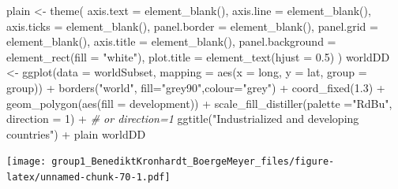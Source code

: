 \documentclass[
  11pt,
  a4paper,
  twoside]{scrbook}
\newenvironment{Shaded}{\begin{snugshade}}{\end{snugshade}}
\newcommand{\AttributeTok}[1]{\textcolor[rgb]{0.77,0.63,0.00}{#1}}
\newcommand{\CommentTok}[1]{\textcolor[rgb]{0.56,0.35,0.01}{\textit{#1}}}
\newcommand{\DecValTok}[1]{\textcolor[rgb]{0.00,0.00,0.81}{#1}}
\newcommand{\FloatTok}[1]{\textcolor[rgb]{0.00,0.00,0.81}{#1}}
\newcommand{\FunctionTok}[1]{\textcolor[rgb]{0.00,0.00,0.00}{#1}}
\newcommand{\NormalTok}[1]{#1}
\newcommand{\OtherTok}[1]{\textcolor[rgb]{0.56,0.35,0.01}{#1}}
\newcommand{\SpecialCharTok}[1]{\textcolor[rgb]{0.00,0.00,0.00}{#1}}
\newcommand{\StringTok}[1]{\textcolor[rgb]{0.31,0.60,0.02}{#1}}
\begin{document}
\linespread{1}

\begin{Shaded}
\begin{Highlighting}[]

\NormalTok{plain }\OtherTok{\textless{}{-}} \FunctionTok{theme}\NormalTok{(}
  \AttributeTok{axis.text =} \FunctionTok{element\_blank}\NormalTok{(),}
  \AttributeTok{axis.line =} \FunctionTok{element\_blank}\NormalTok{(),}
  \AttributeTok{axis.ticks =} \FunctionTok{element\_blank}\NormalTok{(),}
  \AttributeTok{panel.border =} \FunctionTok{element\_blank}\NormalTok{(),}
  \AttributeTok{panel.grid =} \FunctionTok{element\_blank}\NormalTok{(),}
  \AttributeTok{axis.title =} \FunctionTok{element\_blank}\NormalTok{(),}
  \AttributeTok{panel.background =} \FunctionTok{element\_rect}\NormalTok{(}\AttributeTok{fill =} \StringTok{"white"}\NormalTok{),}
  \AttributeTok{plot.title =} \FunctionTok{element\_text}\NormalTok{(}\AttributeTok{hjust =} \FloatTok{0.5}\NormalTok{)}
\NormalTok{)}
\NormalTok{worldDD }\OtherTok{\textless{}{-}} \FunctionTok{ggplot}\NormalTok{(}\AttributeTok{data =}\NormalTok{ worldSubset, }\AttributeTok{mapping =} \FunctionTok{aes}\NormalTok{(}\AttributeTok{x =}\NormalTok{ long, }\AttributeTok{y =}\NormalTok{ lat, }\AttributeTok{group =}\NormalTok{ group)) }\SpecialCharTok{+}
  \FunctionTok{borders}\NormalTok{(}\StringTok{"world"}\NormalTok{, }\AttributeTok{fill=}\StringTok{"grey90"}\NormalTok{,}\AttributeTok{colour=}\StringTok{"grey"}\NormalTok{) }\SpecialCharTok{+} 
  \FunctionTok{coord\_fixed}\NormalTok{(}\FloatTok{1.3}\NormalTok{) }\SpecialCharTok{+}
  \FunctionTok{geom\_polygon}\NormalTok{(}\FunctionTok{aes}\NormalTok{(}\AttributeTok{fill =}\NormalTok{ development)) }\SpecialCharTok{+}
  \FunctionTok{scale\_fill\_distiller}\NormalTok{(}\AttributeTok{palette =}\StringTok{"RdBu"}\NormalTok{, }\AttributeTok{direction =} \DecValTok{1}\NormalTok{) }\SpecialCharTok{+} \CommentTok{\# or direction=1}
  \FunctionTok{ggtitle}\NormalTok{(}\StringTok{"Industrialized and developing countries"}\NormalTok{) }\SpecialCharTok{+}
\NormalTok{  plain}
\NormalTok{worldDD}
\end{Highlighting}
\end{Shaded}

\linespread{1}\texttt{[image: group1\_BenediktKronhardt\_BoergeMeyer\_files/figure-latex/unnamed-chunk-70-1.pdf]}

\linespread{1}
\end{document}
